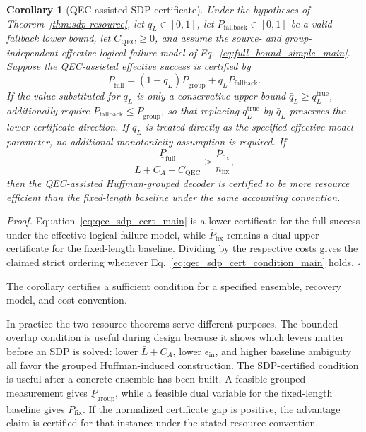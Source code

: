 \documentclass[
 reprint,
 amsmath,amssymb,
 aps,
 pra,
 floatfix,
]{revtex4-2}
\newtheorem{corollary}[theorem]{Corollary}
\begin{document}
\begin{corollary}[QEC-assisted SDP certificate]\label{cor:qec-sdp}
Under the hypotheses of Theorem~\ref{thm:sdp-resource}, let $q_L\in[0,1]$, let $P_{\mathrm{fallback}}\in[0,1]$ be a valid fallback lower bound, let $C_{\mathrm{QEC}}\ge0$, and assume the source- and group-independent effective logical-failure model of Eq.~\eqref{eq:full_bound_simple_main}. Suppose the QEC-assisted effective success is certified by
\begin{equation}
    \underline P_{\mathrm{full}}
    =
    (1-q_L)\underline P_{\mathrm{group}}
    +
    q_LP_{\mathrm{fallback}} .
    \label{eq:qec_sdp_cert_main}
\end{equation}
If the value substituted for \(q_L\) is only a conservative upper bound \(\bar q_L\ge q_L^{\mathrm{true}}\), additionally require \(P_{\mathrm{fallback}}\le\underline P_{\mathrm{group}}\), so that replacing \(q_L^{\mathrm{true}}\) by \(\bar q_L\) preserves the lower-certificate direction. If \(q_L\) is treated directly as the specified effective-model parameter, no additional monotonicity assumption is required.
If
\begin{equation}
    \frac{\underline P_{\mathrm{full}}}
    {\bar L+C_A+C_{\mathrm{QEC}}}
    >
    \frac{\overline P_{\mathrm{fix}}}{n_{\mathrm{fix}}},
    \label{eq:qec_sdp_cert_condition_main}
\end{equation}
then the QEC-assisted Huffman-grouped decoder is certified to be more resource efficient than the fixed-length baseline under the same accounting convention.
\end{corollary}
\textit{Proof.} Equation~\eqref{eq:qec_sdp_cert_main} is a lower certificate for the full success under the effective logical-failure model, while $\overline P_{\mathrm{fix}}$ remains a dual upper certificate for the fixed-length baseline. Dividing by the respective costs gives the claimed strict ordering whenever Eq.~\eqref{eq:qec_sdp_cert_condition_main} holds. \(\square\)

The corollary certifies a sufficient condition for a specified ensemble, recovery model, and cost convention.

In practice the two resource theorems serve different purposes. The bounded-overlap condition is useful during design because it shows which levers matter before an SDP is solved: lower \(\bar L+C_A\), lower \(\epsilon_{\mathrm{in}}\), and higher baseline ambiguity all favor the grouped Huffman-induced construction. The SDP-certified condition is useful after a concrete ensemble has been built. A feasible grouped measurement gives \(\underline P_{\mathrm{group}}\), while a feasible dual variable for the fixed-length baseline gives \(\overline P_{\mathrm{fix}}\). If the normalized certificate gap is positive, the advantage claim is certified for that instance under the stated resource convention.
\end{document}
